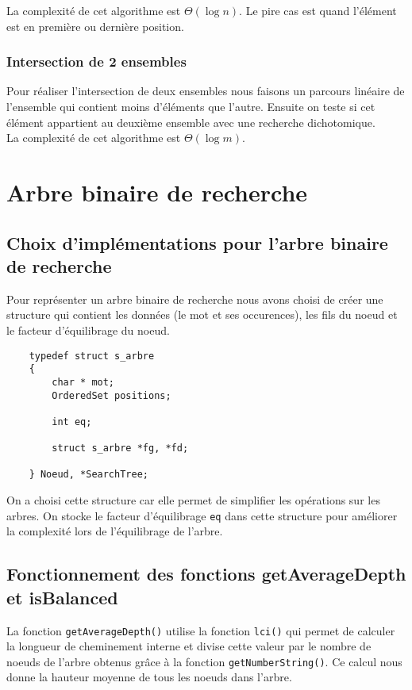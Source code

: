 \documentclass[11pt]{article}
\begin{document}
        La complexité de cet algorithme est $\Theta(\log{}n)$. Le pire cas
        est quand l'élément est en première ou dernière position.

        \subsubsection{Intersection de 2 ensembles}
        Pour réaliser l'intersection de deux ensembles nous faisons un parcours
        linéaire de l'ensemble qui contient moins d'éléments que l'autre. Ensuite
        on teste si cet élément appartient au deuxième ensemble avec une
        recherche dichotomique.\\

        La complexité de cet algorithme est $\Theta(\log{}m)$.


\section{Arbre binaire de recherche}

    \subsection{Choix d'implémentations pour l'arbre binaire de recherche}
    Pour représenter un arbre binaire de recherche nous avons choisi de créer
    une structure qui contient les données (le mot et ses occurences), les fils
    du noeud et le facteur d'équilibrage du noeud.

    \begin{verbatim}
    typedef struct s_arbre
    {
        char * mot;
        OrderedSet positions;

        int eq;

        struct s_arbre *fg, *fd;

    } Noeud, *SearchTree;
    \end{verbatim}

    On a choisi cette structure car elle permet de simplifier les opérations
    sur les arbres. On stocke le facteur d'équilibrage \texttt{eq} dans cette
    structure pour améliorer la complexité lors de l'équilibrage de l'arbre.

    \subsection{Fonctionnement des fonctions getAverageDepth et isBalanced}
    La fonction \texttt{getAverageDepth()} utilise la fonction \texttt{lci()}
    qui permet de calculer la longueur de cheminement interne et
    divise cette valeur par le nombre de noeuds de l'arbre obtenus
    grâce à la fonction \texttt{getNumberString()}. Ce calcul nous donne la
    hauteur moyenne de tous les noeuds dans l'arbre.\\
\end{document}
